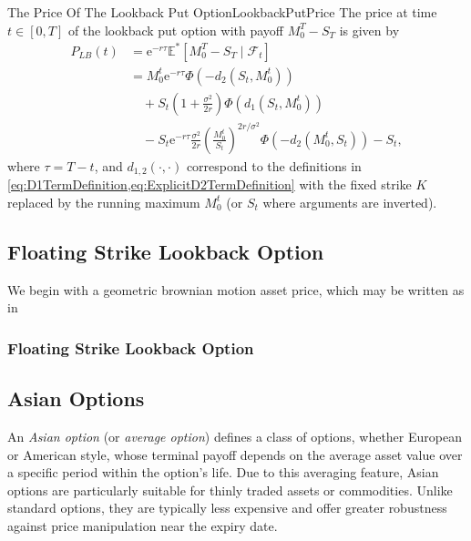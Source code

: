 \begin{prop}{The Price Of The Lookback Put Option}{LookbackPutPrice}
	The price at time $t \in [0,T]$ of the lookback put option with payoff $M_0^T - S_T$ is given by
	\begin{align} \label{eq:LookbackPutPrice}
		P_{LB}(t) & = \mathrm{e}^{-r\tau} \mathbb{E}^\ast \left[ M_0^T - S_T \mid \mathcal{F}_t \right] \nonumber                                                             \\
		          & = M_0^t \mathrm{e}^{-r\tau} \Phi \left( -d_2\left(S_t, M_0^t\right) \right) \nonumber                                                                     \\
		          & \quad + S_t \left( 1 + \frac{\sigma^2}{2r} \right) \Phi \left( d_1\left(S_t, M_0^t\right) \right) \nonumber                                               \\
		          & \quad - S_t \mathrm{e}^{-r\tau} \frac{\sigma^2}{2r} \left( \frac{M_0^t}{S_t} \right)^{2r/\sigma^2} \Phi \left( -d_2\left(M_0^t, S_t\right) \right) - S_t,
	\end{align}
	where $\tau = T-t$, and $d_{1,2}(\cdot, \cdot)$ correspond to the definitions in \cref{eq:D1TermDefinition,eq:ExplicitD2TermDefinition} with the fixed strike $K$ replaced by the running maximum $M_0^t$ (or $S_t$ where arguments are inverted).
\end{prop}

\subsection{Floating Strike Lookback Option}

We begin with a geometric brownian motion asset price, which may be written as in



\subsubsection{Floating Strike Lookback Option}

\subsection{Asian Options}
An \emph{Asian option} (or \emph{average option}) defines a class of options, whether European or American style, whose terminal payoff depends on the average asset value over a specific period within the option's life. Due to this averaging feature, Asian options are particularly suitable for thinly traded assets or commodities. Unlike standard options, they are typically less expensive and offer greater robustness against price manipulation near the expiry date.

